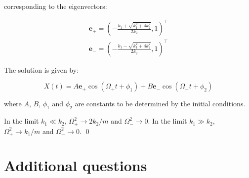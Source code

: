 \documentclass[12pt]{article}
\begin{document}
corresponding to the eigenvectors:

\begin{equation}
\begin{split}
    \mathbf{e}_{+} = \left( -\frac{k_{1} + \sqrt{k_{1}^2 + 4k_{2}^2}}{2k_{2}}, 1 \right)^{\intercal} \\
    \mathbf{e}_{-} = \left( -\frac{k_{1} - \sqrt{k_{1}^2 + 4k_{2}^2}}{2k_{2}}, 1 \right)^{\intercal}
\end{split}
\end{equation}

The solution is given by:

\begin{equation}
    X(t) = A \mathbf{e}_{+} \cos{(\Omega_{+} t + \phi_{1})} + B \mathbf{e}_{-} \cos{(\Omega_{-} t + \phi_{2})} 
\end{equation}

where $A$, $B$, $\phi_{1}$ and $\phi_{2}$ are constants to be determined by the initial conditions.

In the limit $k_{1} \ll k_{2}$, $\Omega_{+}^{2} \to 2k_{2}/m$ and $\Omega_{-}^{2} \to 0$. In the limit $k_{1} \gg k_{2}$, $\Omega_{+}^{2} \to k_{1}/m$ and $\Omega_{-}^{2} \to 0$.
\qed


\pagebreak
\section*{Additional questions}


\problem{}{}
\end{document}

